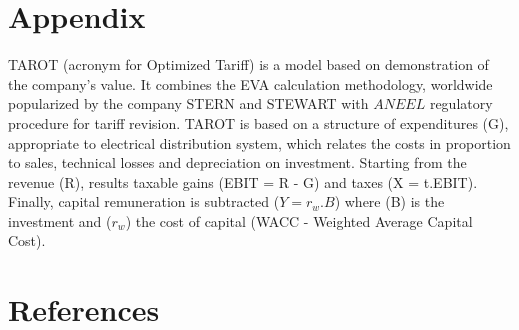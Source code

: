 \documentclass[10pt, letterpaper]{elsarticle}
\begin{document}
\section{Appendix}
\label{S.6}

TAROT (acronym for Optimized Tariff) is a model based on demonstration of the company's value. It combines the EVA calculation methodology, worldwide popularized by the company STERN and STEWART with $ANEEL$ regulatory procedure for tariff revision.
TAROT is based on a structure of expenditures (G), appropriate to electrical distribution system, which relates the costs in proportion to sales, technical losses and depreciation on investment.  Starting from the revenue (R), results taxable gains (EBIT = R - G) and taxes (X = t.EBIT).
Finally, capital remuneration is subtracted ($Y = r_w.B$) where (B) is the investment and ($r_w$) the cost of capital (WACC - Weighted Average Capital Cost).\\


\section{References}
\label{S.7}









\end{document}

